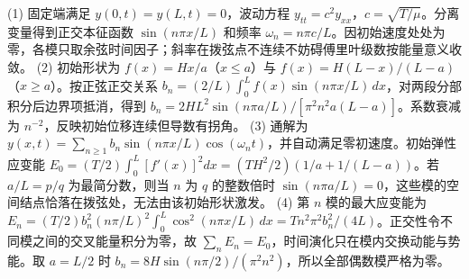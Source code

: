 (1) 固定端满足 \(y(0,t)=y(L,t)=0\)，波动方程 \(y_{tt}=c^2y_{xx}\)，\(c=\sqrt{T/\mu}\)。分离变量得到正交本征函数 \(\sin(n\pi x/L)\) 和频率 \(\omega_n=n\pi c/L\)。因初始速度处处为零，各模只取余弦时间因子；斜率在拨弦点不连续不妨碍傅里叶级数按能量意义收敛。
(2) 初始形状为 \(f(x)=Hx/a\)（\(x\le a\)）与 \(f(x)=H(L-x)/(L-a)\)（\(x\ge a\)）。按正弦正交关系 \(b_n=(2/L)\int_0^L f(x)\sin(n\pi x/L)\,dx\)，对两段分部积分后边界项抵消，得到 \(b_n=2HL^2\sin(n\pi a/L)/[\pi^2n^2a(L-a)]\)。系数衰减为 \(n^{-2}\)，反映初始位移连续但导数有拐角。
(3) 通解为 \(y(x,t)=\sum_{n\ge1}b_n\sin(n\pi x/L)\cos(\omega_nt)\)，并自动满足零初速度。初始弹性应变能 \(E_0=(T/2)\int_0^L[f'(x)]^2dx=(TH^2/2)(1/a+1/(L-a))\)。若 \(a/L=p/q\) 为最简分数，则当 \(n\) 为 \(q\) 的整数倍时 \(\sin(n\pi a/L)=0\)，这些模的空间结点恰落在拨弦处，无法由该初始形状激发。
(4) 第 \(n\) 模的最大应变能为 \(E_n=(T/2)b_n^2(n\pi/L)^2\int_0^L\cos^2(n\pi x/L)\,dx=Tn^2\pi^2 b_n^2/(4L)\)。正交性令不同模之间的交叉能量积分为零，故 \(\sum_nE_n=E_0\)，时间演化只在模内交换动能与势能。取 \(a=L/2\) 时 \(b_n=8H\sin(n\pi/2)/(\pi^2n^2)\)，所以全部偶数模严格为零。
